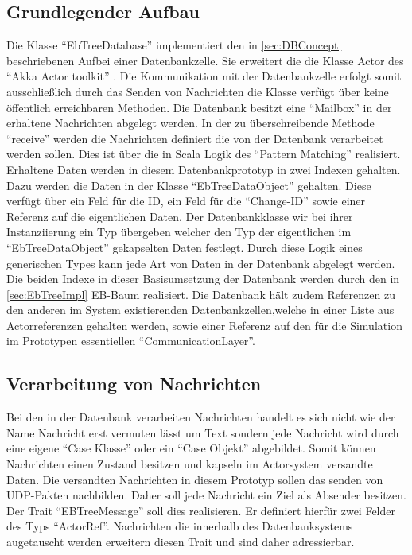 \documentclass[a4paper,11pt,oneside,%
headsepline,												%
footsepline,												%
bibtotocnumbered									%
]{scrreprt}
\begin{document}
\subsection{Grundlegender Aufbau}
Die Klasse \enquote{EbTreeDatabase} implementiert den in \autoref{sec:DBConcept} beschriebenen Aufbei einer Datenbankzelle. Sie erweitert die die Klasse Actor des \enquote{Akka Actor toolkit} \autocite{Akka}. Die Kommunikation mit der Datenbankzelle erfolgt somit ausschließlich durch das Senden von Nachrichten die Klasse verfügt über keine öffentlich erreichbaren Methoden. Die Datenbank besitzt eine \enquote{Mailbox} in der erhaltene Nachrichten abgelegt werden. In der zu überschreibende Methode \enquote{receive} werden die Nachrichten definiert die von der Datenbank verarbeitet werden sollen. Dies ist über die in Scala Logik des \enquote{Pattern Matching} realisiert. Erhaltene Daten werden in diesem Datenbankprototyp in zwei Indexen gehalten. Dazu werden die Daten in der Klasse \enquote{EbTreeDataObject} gehalten. Diese verfügt über ein Feld für die \ac{ID}, ein Feld für die \enquote{Change-ID} sowie einer Referenz auf die eigentlichen Daten. Der Datenbankklasse wir bei ihrer Instanziierung ein Typ übergeben welcher den Typ der eigentlichen im  \enquote{EbTreeDataObject} gekapselten Daten festlegt. Durch diese Logik eines generischen Types kann jede Art von Daten in der Datenbank abgelegt werden. Die beiden Indexe in dieser Basisumsetzung der Datenbank werden durch den in \autoref{sec:EbTreeImpl}
\ac{EB-Baum} realisiert. Die Datenbank hält zudem Referenzen zu den anderen im System existierenden Datenbankzellen,welche in einer Liste aus Actorreferenzen gehalten werden, sowie einer Referenz auf den für die Simulation im Prototypen essentiellen \enquote{CommunicationLayer}.\\

\subsection{Verarbeitung von Nachrichten}
Bei den in der Datenbank verarbeiten Nachrichten handelt es sich nicht wie der Name Nachricht erst vermuten lässt um Text sondern jede Nachricht wird durch eine eigene \enquote{Case Klasse} oder ein \enquote{Case Objekt} abgebildet. Somit können Nachrichten einen Zustand besitzen und kapseln im Actorsystem versandte Daten. Die versandten Nachrichten in diesem Prototyp sollen das senden von UDP-Pakten nachbilden. Daher soll jede Nachricht ein Ziel als Absender besitzen. Der Trait \enquote{EBTreeMessage} soll dies realisieren. Er definiert hierfür zwei Felder des Typs \enquote{ActorRef}. Nachrichten die innerhalb des Datenbanksystems augetauscht werden erweitern diesen Trait und sind daher adressierbar.
\end{document}
